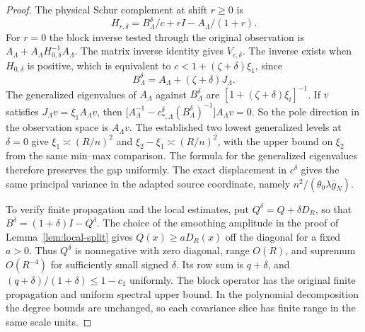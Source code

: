 \documentclass[11pt]{article}
\theoremstyle{definition}
\begin{document}
\begin{proof}
The physical Schur complement at shift \(r\ge0\) is
\begin{equation}
 H_{r,\delta}=B_\Lambda^\delta/c+rI
                         -A_\Lambda/(1+r).
\end{equation}
For \(r=0\) the block inverse tested through the original
observation is \(A_\Lambda+A_\Lambda H_{0,\delta}^{-1}
A_\Lambda\). The matrix inverse identity gives \(V_{c,\delta}\).
The inverse exists when \(H_{0,\delta}\) is positive, which
is equivalent to \(c<1+(\zeta+\delta)\xi_1\), since
\begin{equation}
 B^\delta_\Lambda=A_\Lambda+(\zeta+\delta)J_\Lambda .
\end{equation}
The generalized eigenvalues of \(A_\Lambda\) against
\(B^\delta_\Lambda\) are
\([1+(\zeta+\delta)\xi_i]^{-1}\). If \(v\) satisfies
\(J_\Lambda v=\xi_1 A_\Lambda v\), then
\(\big[A_\Lambda^{-1}
        -c_{*,\Lambda}^\delta(B^\delta_\Lambda)^{-1}\big]A_\Lambda v=0\).
So the pole direction in the observation space is \(A_\Lambda v\).
The established two lowest generalized levels at \(\delta=0\)
give \(\xi_1\asymp (R/n)^2\) and
\(\xi_2-\xi_1\asymp (R/n)^2\), with the upper bound on
\(\xi_2\) from the same min--max comparison. The formula for
the generalized eigenvalues therefore preserves the gap
uniformly. The exact displacement in \(c^\delta\) gives the
same principal variance in the adapted source coordinate,
namely \(n^2/(\theta_0\lambda\bar g_N)\).

To verify finite propagation and the local estimates, put
\(Q^\delta=Q+\delta D_R\), so that
\(B^\delta=(1+\delta)I-Q^\delta\).
The choice of the smoothing amplitude in the proof of
Lemma~\ref{lem:local-split} gives \(Q(x)\ge aD_R(x)\)
off the diagonal for a fixed \(a>0\). Thus \(Q^\delta\)
is nonnegative with zero diagonal, range \(O(R)\), and
supremum \(O(R^{-4})\) for sufficiently small signed
\(\delta\). Its row sum is \(q+\delta\), and
\((q+\delta)/(1+\delta)\le 1-c_1\) uniformly. The block
operator has the original finite propagation and uniform
spectral upper bound. In the polynomial decomposition the
degree bounds are unchanged, so each covariance slice has
finite range in the same scale units.


\end{proof}
\end{document}
